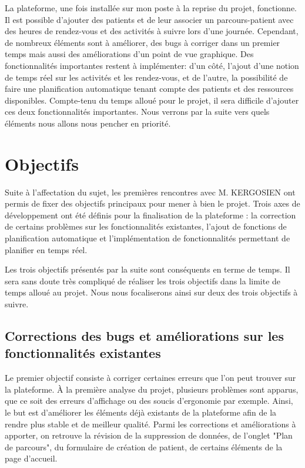 \documentclass[noposter]{polytech/polytech}
\begin{document}
La plateforme, une fois installée sur mon poste à la reprise du projet, fonctionne. Il est possible d'ajouter des patients et de leur associer un parcours-patient avec des heures de rendez-vous et des activités à suivre lors d'une journée. Cependant, de nombreux éléments sont à améliorer, des bugs à corriger dans un premier temps mais aussi des améliorations d'un point de vue graphique. Des fonctionnalités importantes restent à implémenter: d'un côté, l'ajout d'une notion de temps réel sur les activités et les rendez-vous, et de l'autre, la possibilité de faire une planification automatique tenant compte des patients et des ressources disponibles. Compte-tenu du temps alloué pour le projet, il sera difficile d'ajouter ces deux fonctionnalités importantes. Nous verrons par la suite vers quels éléments nous allons nous pencher en priorité. 


\section{Objectifs}

Suite à l'affectation du sujet, les premières rencontres avec M. KERGOSIEN ont permis de fixer des objectifs principaux pour mener à bien le projet. Trois axes de développement ont été définis pour la finalisation de la plateforme : la correction de certains problèmes sur les fonctionnalités existantes, l'ajout de fonctions de planification automatique et l'implémentation de fonctionnalités permettant de planifier en temps réel. 

Les trois objectifs présentés par la suite sont conséquents en terme de temps. Il sera sans doute très compliqué de réaliser les trois objectifs dans la limite de temps alloué au projet. Nous nous focaliserons ainsi sur deux des trois objectifs à suivre. 


\subsection{Corrections des bugs et améliorations sur les fonctionnalités existantes}

Le premier objectif consiste à corriger certaines erreurs que l'on peut trouver sur la plateforme. À la première analyse du projet, plusieurs problèmes sont apparus, que ce soit des erreurs d'affichage ou des soucis d'ergonomie par exemple. Ainsi, le but est d'améliorer les éléments déjà existants de la plateforme afin de la rendre plus stable et de meilleur qualité. Parmi les corrections et améliorations à apporter, on retrouve la révision de la suppression de données, de l'onglet "Plan de parcours", du formulaire de création de patient, de certains éléments de la page d'accueil. 
\end{document}
